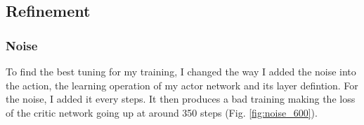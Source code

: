 \documentclass{article}
\begin{document}

\subsection{Refinement}

\subsubsection{Noise}

To find the best tuning for my training, I changed the way I added the noise
into the action, the learning operation of my actor network and its layer
defintion. For the noise, I added it every steps. It then produces a bad
training making the loss of the critic network going up at around 350 steps
(Fig. \ref{fig:noise_600}).
\end{document}
